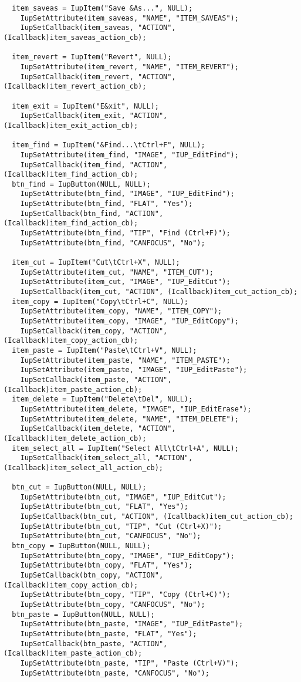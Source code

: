\documentclass{ctexart}
\begin{document}
\begin{lstlisting}
  item_saveas = IupItem("Save &As...", NULL);
    IupSetAttribute(item_saveas, "NAME", "ITEM_SAVEAS");
    IupSetCallback(item_saveas, "ACTION", (Icallback)item_saveas_action_cb);

  item_revert = IupItem("Revert", NULL);
    IupSetAttribute(item_revert, "NAME", "ITEM_REVERT");
    IupSetCallback(item_revert, "ACTION", (Icallback)item_revert_action_cb);
    
  item_exit = IupItem("E&xit", NULL);
    IupSetCallback(item_exit, "ACTION", (Icallback)item_exit_action_cb);

  item_find = IupItem("&Find...\tCtrl+F", NULL);
    IupSetAttribute(item_find, "IMAGE", "IUP_EditFind");
    IupSetCallback(item_find, "ACTION", (Icallback)item_find_action_cb);
  btn_find = IupButton(NULL, NULL);
    IupSetAttribute(btn_find, "IMAGE", "IUP_EditFind");
    IupSetAttribute(btn_find, "FLAT", "Yes");
    IupSetCallback(btn_find, "ACTION", (Icallback)item_find_action_cb);
    IupSetAttribute(btn_find, "TIP", "Find (Ctrl+F)");
    IupSetAttribute(btn_find, "CANFOCUS", "No");

  item_cut = IupItem("Cut\tCtrl+X", NULL);
    IupSetAttribute(item_cut, "NAME", "ITEM_CUT");
    IupSetAttribute(item_cut, "IMAGE", "IUP_EditCut");
    IupSetCallback(item_cut, "ACTION", (Icallback)item_cut_action_cb);
  item_copy = IupItem("Copy\tCtrl+C", NULL);
    IupSetAttribute(item_copy, "NAME", "ITEM_COPY");  
    IupSetAttribute(item_copy, "IMAGE", "IUP_EditCopy");
    IupSetCallback(item_copy, "ACTION", (Icallback)item_copy_action_cb);
  item_paste = IupItem("Paste\tCtrl+V", NULL);
    IupSetAttribute(item_paste, "NAME", "ITEM_PASTE");
    IupSetAttribute(item_paste, "IMAGE", "IUP_EditPaste");
    IupSetCallback(item_paste, "ACTION", (Icallback)item_paste_action_cb);
  item_delete = IupItem("Delete\tDel", NULL);
    IupSetAttribute(item_delete, "IMAGE", "IUP_EditErase");  
    IupSetAttribute(item_delete, "NAME", "ITEM_DELETE");
    IupSetCallback(item_delete, "ACTION", (Icallback)item_delete_action_cb);
  item_select_all = IupItem("Select All\tCtrl+A", NULL);
    IupSetCallback(item_select_all, "ACTION", (Icallback)item_select_all_action_cb);

  btn_cut = IupButton(NULL, NULL);
    IupSetAttribute(btn_cut, "IMAGE", "IUP_EditCut");
    IupSetAttribute(btn_cut, "FLAT", "Yes");
    IupSetCallback(btn_cut, "ACTION", (Icallback)item_cut_action_cb);
    IupSetAttribute(btn_cut, "TIP", "Cut (Ctrl+X)");
    IupSetAttribute(btn_cut, "CANFOCUS", "No");
  btn_copy = IupButton(NULL, NULL);
    IupSetAttribute(btn_copy, "IMAGE", "IUP_EditCopy");
    IupSetAttribute(btn_copy, "FLAT", "Yes");
    IupSetCallback(btn_copy, "ACTION", (Icallback)item_copy_action_cb);
    IupSetAttribute(btn_copy, "TIP", "Copy (Ctrl+C)");
    IupSetAttribute(btn_copy, "CANFOCUS", "No");
  btn_paste = IupButton(NULL, NULL);
    IupSetAttribute(btn_paste, "IMAGE", "IUP_EditPaste");
    IupSetAttribute(btn_paste, "FLAT", "Yes");
    IupSetCallback(btn_paste, "ACTION", (Icallback)item_paste_action_cb);
    IupSetAttribute(btn_paste, "TIP", "Paste (Ctrl+V)");
    IupSetAttribute(btn_paste, "CANFOCUS", "No");


\end{lstlisting}
\end{document}

